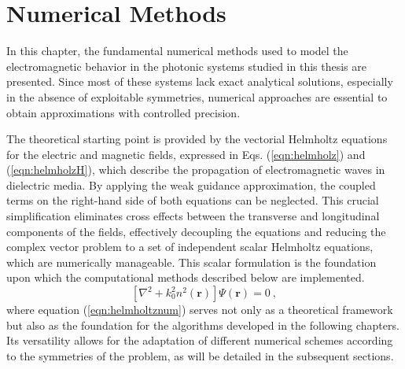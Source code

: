 \chapter{Numerical Methods \label{cap:num}}
In this chapter, the fundamental numerical methods used to model the electromagnetic behavior in the photonic systems studied in this thesis are presented. Since most of these systems lack exact analytical solutions, especially in the absence of exploitable symmetries, numerical approaches are essential to obtain approximations with controlled precision.

The theoretical starting point is provided by the vectorial Helmholtz equations for the electric and magnetic fields, expressed in Eqs. (\ref{eqn:helmholz}) and (\ref{eqn:helmholzH}), which describe the propagation of electromagnetic waves in dielectric media. By applying the weak guidance approximation, the coupled terms on the right-hand side of both equations can be neglected. This crucial simplification eliminates cross effects between the transverse and longitudinal components of the fields, effectively decoupling the equations and reducing the complex vector problem to a set of independent scalar Helmholtz equations, which are numerically manageable. This scalar formulation is the foundation upon which the computational methods described below are implemented.
\begin{equation}
\left[\nabla^2 + k_0^2 n^2(\textbf{r})\right]\Psi(\textbf{r}) = 0 \ , \label{eqn:helmholtznum}
\end{equation}
where equation (\ref{eqn:helmholtznum}) serves not only as a theoretical framework but also as the foundation for the algorithms developed in the following chapters. Its versatility allows for the adaptation of different numerical schemes according to the symmetries of the problem, as will be detailed in the subsequent sections.
